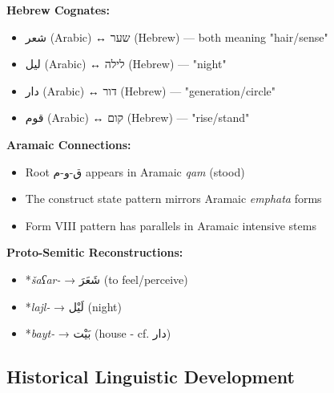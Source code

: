 \documentclass[letter,12pt]{article}
\begin{document}
\begin{tcolorbox}[colback=boxcolor,colframe=dialectcolor,title=\textbf{Semitic Language Connections},breakable]
\textbf{Hebrew Cognates:}
\begin{itemize}
\item \textarabic{شعر} (Arabic) ↔ \texthebrew{שער} (Hebrew) — both meaning "hair/sense"
\item \textarabic{ليل} (Arabic) ↔ \texthebrew{לילה} (Hebrew) — "night"
\item \textarabic{دار} (Arabic) ↔ \texthebrew{דור} (Hebrew) — "generation/circle"
\item \textarabic{قوم} (Arabic) ↔ \texthebrew{קום} (Hebrew) — "rise/stand"
\end{itemize}

\textbf{Aramaic Connections:}
\begin{itemize}
\item Root \textarabic{ق-و-م} appears in Aramaic \textit{qam} (stood)
\item The construct state pattern mirrors Aramaic \textit{emphata} forms
\item Form VIII pattern has parallels in Aramaic intensive stems
\end{itemize}

\textbf{Proto-Semitic Reconstructions:}
\begin{itemize}
\item *\textit{šaʕar-} → \textarabic{شَعَرَ} (to feel/perceive)
\item *\textit{lajl-} → \textarabic{لَيْل} (night)
\item *\textit{bayt-} → \textarabic{بَيْت} (house - cf. \textarabic{دار})
\end{itemize}
\end{tcolorbox}

\subsection{Historical Linguistic Development}
\end{document}
